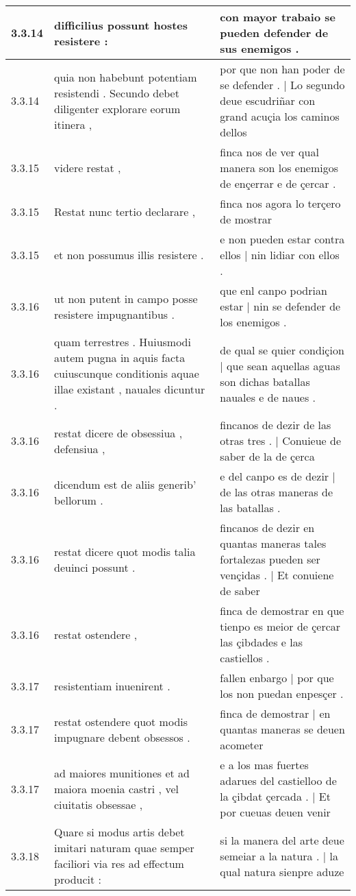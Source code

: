 \begin{tabular}{|p{1cm}|p{6.5cm}|p{6.5cm}|}
3.3.14 & difficilius possunt hostes resistere : & con mayor trabaio se pueden defender de sus enemigos . \\\hline
3.3.14 & quia non habebunt potentiam resistendi . Secundo debet diligenter explorare eorum itinera , & por que non han poder de se defender . | Lo segundo deue escudriñar con grand acuçia los caminos dellos \\\hline
3.3.15 & videre restat , & finca nos de ver qual manera son los enemigos de ençerrar e de çercar . \\\hline
3.3.15 & Restat nunc tertio declarare , & finca nos agora lo terçero de mostrar \\\hline
3.3.15 & et non possumus illis resistere . & e non pueden estar contra ellos | nin lidiar con ellos . \\\hline
3.3.16 & ut non putent in campo posse resistere impugnantibus . & que enl canpo podrian estar | nin se defender de los enemigos . \\\hline
3.3.16 & quam terrestres . Huiusmodi autem pugna in aquis facta cuiuscunque conditionis aquae illae existant , nauales dicuntur . & de qual se quier condiçion | que sean aquellas aguas son dichas batallas nauales e de naues . \\\hline
3.3.16 & restat dicere de obsessiua , defensiua , & fincanos de dezir de las otras tres . | Conuieue de saber de la de çerca \\\hline
3.3.16 & dicendum est de aliis generib’ bellorum . & e del canpo es de dezir | de las otras maneras de las batallas . \\\hline
3.3.16 & restat dicere quot modis talia deuinci possunt . & fincanos de dezir en quantas maneras tales fortalezas pueden ser vençidas . | Et conuiene de saber \\\hline
3.3.16 & restat ostendere , & finca de demostrar en que tienpo es meior de çercar las çibdades e las castiellos . \\\hline
3.3.17 & resistentiam inuenirent . & fallen enbargo | por que los non puedan enpesçer . \\\hline
3.3.17 & restat ostendere quot modis impugnare debent obsessos . & finca de demostrar | en quantas maneras se deuen acometer \\\hline
3.3.17 & ad maiores munitiones et ad maiora moenia castri , vel ciuitatis obsessae , & e a los mas fuertes adarues del castielloo de la çibdat çercada . | Et por cueuas deuen venir \\\hline
3.3.18 & Quare si modus artis debet imitari naturam quae semper faciliori via res ad effectum producit : & si la manera del arte deue semeiar a la natura . | la qual natura sienpre aduze \\\hline

\end{tabular}
